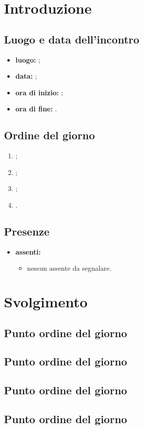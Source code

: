 \section*{Introduzione}
\subsection*{Luogo e data dell'incontro}
\begin{itemize}
	\item \textbf{luogo:} ;
	\item \textbf{data:} ;
	\item \textbf{ora di inizio:} ;
	\item \textbf{ora di fine:} .
\end{itemize}

\subsection*{Ordine del giorno}
\begin{enumerate}
	\item ;
	\item ;
	\item ;
	\item .
\end{enumerate}

\subsection*{Presenze}
\begin{itemize}
	\item \textbf{assenti:}
	\begin{itemize}
		\item nessun assente da segnalare.
	\end{itemize}
\end{itemize}

\section*{Svolgimento}
\subsection*{Punto ordine del giorno}
\subsection*{Punto ordine del giorno}
\subsection*{Punto ordine del giorno}
\subsection*{Punto ordine del giorno}
